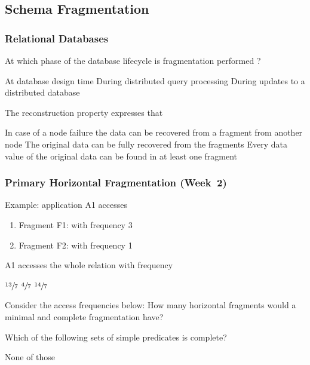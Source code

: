 \documentclass[12pt,a4paper]{exam} %
\begin{document}
\begin{flushleft}
\begin{multicols*}{2}
\begin{questions}
\subsection{Schema Fragmentation}
\subsubsection{Relational Databases}

\question At which phase of the database lifecycle is fragmentation performed ?
\begin{checkboxes}
\CorrectChoice At database design time
\choice During distributed query processing
\choice During updates to a distributed database
\end{checkboxes}

\question The reconstruction property expresses that
\begin{checkboxes}
\choice In case of a node failure the data can be recovered from a fragment from another node
\CorrectChoice The original data can be fully recovered from the fragments
\choice Every data value of the original data can be found in at least one fragment
\end{checkboxes}



\subsubsection{Primary Horizontal Fragmentation (Week~2)} %

\question Example: application A1 accesses
\begin{enumerate}
\item Fragment F1: with frequency 3
\item Fragment F2: with frequency 1
\end{enumerate}
A1 accesses the whole relation with frequency
\begin{checkboxes}
\CorrectChoice $\sfrac{13}{7}$
\choice $\sfrac{4}{7}$
\choice $\sfrac{14}{7}$
\end{checkboxes}

\question Consider the access frequencies below:
How many horizontal fragments would a minimal and complete fragmentation have?
\begin{checkboxes}
\end{checkboxes}

\question Which of the following sets of simple predicates is complete?
\begin{checkboxes}
\CorrectChoice None of those
\end{checkboxes}


\end{questions}
\end{multicols*}
\end{flushleft}
\end{document}
